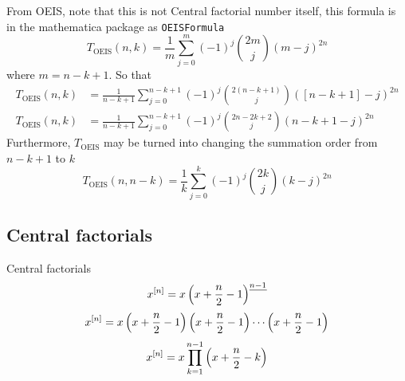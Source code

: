 From OEIS, note that this is not Central factorial number itself, this formula is in the mathematica package as
\texttt{OEISFormula}
\begin{equation*}
    T_{\mathrm{OEIS}} (n,k) = \frac{1}{m} \sum_{j=0}^{m} (-1)^{j} \binom{2m}{j} (m-j)^{2n}
\end{equation*}
where $m=n-k+1$.
So that
\begin{equation}
    \begin{split}
        T_{\mathrm{OEIS}} (n,k) &= \frac{1}{n-k+1} \sum_{j=0}^{n-k+1} (-1)^{j} \binom{2(n-k+1)}{j} ([n-k+1]-j)^{2n} \\
        T_{\mathrm{OEIS}} (n,k) &= \frac{1}{n-k+1} \sum_{j=0}^{n-k+1} (-1)^{j} \binom{2n-2k+2}{j} (n-k+1-j)^{2n}
    \end{split}\label{eq:luschny-oeis}
\end{equation}
Furthermore, $T_{\mathrm{OEIS}}$ may be turned into changing the summation order from $n-k+1$ to $k$
\begin{equation*}
    T_{\mathrm{OEIS}} (n, n-k) = \frac{1}{k} \sum_{j=0}^{k} (-1)^{j} \binom{2k}{j} (k-j)^{2n}
\end{equation*}

\subsection{Central factorials}\label{subsec:central-factorials}
Central factorials
\begin{equation*}
    x^{[n]} = x \left(x+\frac{n}{2}-1 \right)^{\underline{n-1}}
\end{equation*}
\begin{equation*}
    x^{[n]} = x \left( x+\frac{n}{2}-1 \right) \left( x+\frac{n}{2}-1 \right) \cdots \left (x+\frac{n}{2}-1 \right)
\end{equation*}
\begin{equation*}
    x^{[n]} = x \prod_{k=1}^{n-1} \left( x+\frac{n}{2}-k \right)
\end{equation*}